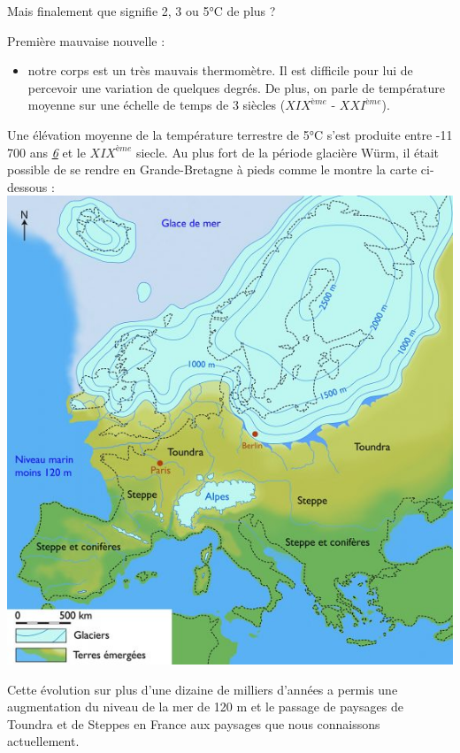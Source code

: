 Mais finalement que signifie 2, 3 ou 5°C de plus ?

Première mauvaise nouvelle :

\begin{itemize}
\tightlist
\item
  notre corps est un très mauvais thermomètre. Il est difficile pour lui
  de percevoir une variation de quelques degrés. De plus, on parle de
  température moyenne sur une échelle de temps de 3 siècles
  (\(XIX^{ème}\) - \(XXI^{ème}\)).
\end{itemize}

Une élévation moyenne de la température terrestre de 5°C s'est produite
entre -11 700 ans
\emph{\href{https://fr.wikipedia.org/wiki/Glaciation_de_W\%C3\%BCrm}{6}}
et le \(XIX^{ème}\) siecle. Au plus fort de la période glacière Würm, il
était possible de se rendre en Grande-Bretagne à pieds comme le montre
la carte ci-dessous :\\
\includegraphics{img/10-Europe-au-LGM-571x600.jpg}

Cette évolution sur plus d'une dizaine de milliers d'années a permis une
augmentation du niveau de la mer de 120 m et le passage de paysages de
Toundra et de Steppes en France aux paysages que nous connaissons
actuellement.


